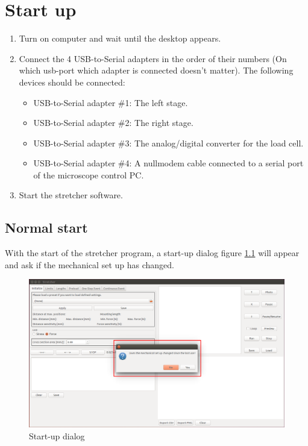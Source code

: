\chapter{Start up}

\begin{enumerate}
	\item Turn on computer and wait until the desktop appears.
	\item Connect the 4 USB-to-Serial adapters in the order of their numbers (On which usb-port which adapter is connected doesn't matter). The following devices should be connected:
	\begin{itemize}
		\item USB-to-Serial adapter \#1: The left stage.
		\item USB-to-Serial adapter \#2: The right stage.
		\item USB-to-Serial adapter \#3: The analog/digital converter for the load cell.
		\item USB-to-Serial adapter \#4: A nullmodem cable connected to a serial port of the microscope control PC.
	\end{itemize}
	\item Start the stretcher software.
\end{enumerate}

\section{Normal start}
\label{sec:normalstart}
With the start of the stretcher program, a start-up dialog figure \ref{fig:startup} will appear and ask if the mechanical set up has changed.

\begin{figure}[!ht]
	\centering
		\includegraphics[width=1.0\textwidth]{images/StartUp1}
	\caption{Start-up dialog}
	\label{fig:startup}
\end{figure}

